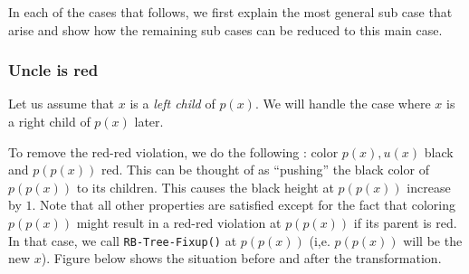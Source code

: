 \documentclass[10pt]{article}
\newcommand{\node}{\texttt{node}}
\begin{document}
\begin{remark}
In each of the cases that follows, we first explain the most general sub case
that arise and show how the remaining sub cases can be reduced to this main
case.
\end{remark}

\subsubsection{Uncle is red}
Let us assume that $x$ is a \emph{left child} of $p(x)$. We will
handle the case where $x$ is a right child of $p(x)$ later.

To remove the red-red violation, we do the following : color $p(x), u(x)$
black and $p(p(x))$ red. This can be thought of as ``pushing'' the black color
of $p(p(x))$ to its children. This causes the black height at $p(p(x))$
increase by $1$. Note that all other properties are satisfied except for the
fact that coloring $p(p(x))$ might result in a red-red violation at $p(p(x))$
if its parent is red. In that case, we call {\tt RB-Tree-Fixup()} at $p(p(x))$
(i,e. $p(p(x))$ will be the new $x$). Figure below shows the situation before
and after the transformation.

\begin{center}
\end{center}
\end{document}
